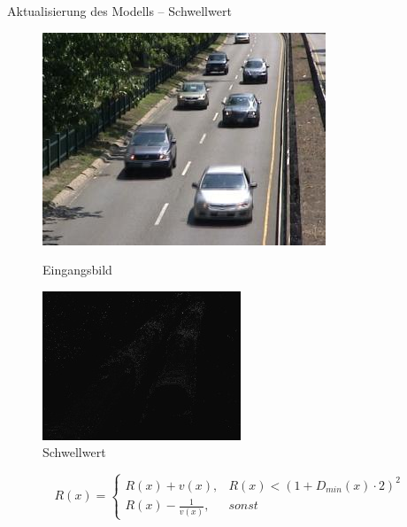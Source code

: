 \documentclass[hyperref={pdfpagelabels=false}]{beamer}
\begin{document}
\begin{frame}[t]{Aktualisierung des Modells -- Schwellwert}
	\vspace{1.65em}
	\begin{figure}
		\centering
		\begin{minipage}{0.45\linewidth}
			\includegraphics[width=1\linewidth]{Abbildungen/Eingang3.jpg}
			\caption*{Eingangsbild}
		\end{minipage}
		\begin{minipage}{0.45\linewidth}
			\includegraphics[width=1\linewidth]{Abbildungen/R.jpg}
			\caption*{Schwellwert}
		\end{minipage}
	\end{figure}
	\bigskip
	\begin{equation*}
		R(x)= 	\left\{
				\begin{array}{ll} 
					R(x) + v(x), &  R(x) < (1 + D_{min}(x) \cdot 2)^2 \\
					R(x) - \frac{1}{v(x)}, & sonst
				\end{array}
			\right .
	\end{equation*}
\end{frame}
\end{document}
